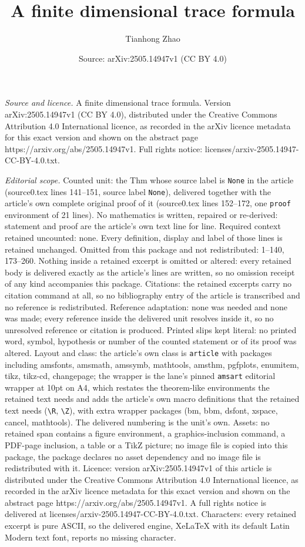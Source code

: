 \documentclass[10pt,a4paper]{amsart}
\title[A finite dimensional trace formula]{A finite dimensional trace formula}
\author{Tianhong Zhao}
\date{Source: arXiv:2505.14947v1 (CC BY 4.0)}
\begin{document}
\maketitle

\noindent\emph{Source and licence.} A finite dimensional trace formula. Version arXiv:2505.14947v1 (CC BY 4.0), distributed under the Creative Commons Attribution 4.0 International licence, as recorded in the arXiv licence metadata for this exact version and shown on the abstract page https://arxiv.org/abs/2505.14947v1. Full rights notice: licenses/arxiv-2505.14947-CC-BY-4.0.txt.\par\smallskip

\noindent\textit{Editorial scope.} Counted unit: the Thm whose source label is \texttt{None} in the article (source0.tex lines 141--151, source label \texttt{None}), delivered together with the article's own complete original proof of it (source0.tex lines 152--172, one \texttt{proof} environment of 21 lines). No mathematics is written, repaired or re-derived: statement and proof are the article's own text line for line. Required context retained uncounted: none. Every definition, display and label of those lines is retained unchanged. Omitted from this package and not redistributed: 1--140, 173--260. Nothing inside a retained excerpt is omitted or altered: every retained body is delivered exactly as the article's lines are written, so no omission receipt of any kind accompanies this package. Citations: the retained excerpts carry no citation command at all, so no bibliography entry of the article is transcribed and no reference is redistributed. Reference adaptation: none was needed and none was made; every reference inside the delivered unit resolves inside it, so no unresolved reference or citation is produced. Printed slips kept literal: no printed word, symbol, hypothesis or number of the counted statement or of its proof was altered. Layout and class: the article's own class is \texttt{article} with packages including amsfonts, amsmath, amssymb, mathtools, amsthm, pgfplots, enumitem, tikz, tikz-cd, changepage; the wrapper is the lane's pinned \texttt{amsart} editorial wrapper at 10pt on A4, which restates the theorem-like environments the retained text needs and adds the article's own macro definitions that the retained text needs (\texttt{\textbackslash R}, \texttt{\textbackslash Z}), with extra wrapper packages (bm, bbm, dsfont, xspace, cancel, mathtools). The delivered numbering is the unit's own. Assets: no retained span contains a figure environment, a graphics-inclusion command, a PDF-page inclusion, a table or a TikZ picture; no image file is copied into this package, the package declares no asset dependency and no image file is redistributed with it. Licence: version arXiv:2505.14947v1 of this article is distributed under the Creative Commons Attribution 4.0 International licence, as recorded in the arXiv licence metadata for this exact version and shown on the abstract page https://arxiv.org/abs/2505.14947v1. A full rights notice is delivered at licenses/arxiv-2505.14947-CC-BY-4.0.txt. Characters: every retained excerpt is pure ASCII, so the delivered engine, XeLaTeX with its default Latin Modern text font, reports no missing character.
\end{document}
